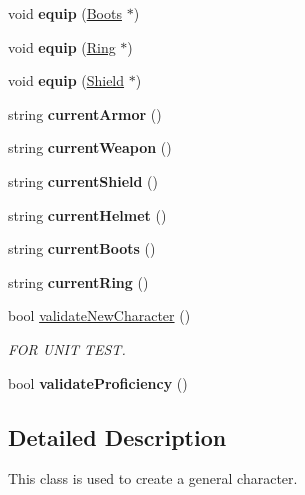 \begin{DoxyCompactItemize}
void {\bfseries equip} (\hyperlink{class_boots}{Boots} $\ast$)
\item 
\hypertarget{class_characters_a865239b8e8826d1213862897061ed718}{}\label{class_characters_a865239b8e8826d1213862897061ed718} 
void {\bfseries equip} (\hyperlink{class_ring}{Ring} $\ast$)
\item 
\hypertarget{class_characters_a5baae929baa10ce365efc64bd3bcea88}{}\label{class_characters_a5baae929baa10ce365efc64bd3bcea88} 
void {\bfseries equip} (\hyperlink{class_shield}{Shield} $\ast$)
\item 
\hypertarget{class_characters_ab2ff7cf1e6a50e005396ac7ff29c6dad}{}\label{class_characters_ab2ff7cf1e6a50e005396ac7ff29c6dad} 
string {\bfseries current\+Armor} ()
\item 
\hypertarget{class_characters_adf56654d23486d7779a006a0b5ed156e}{}\label{class_characters_adf56654d23486d7779a006a0b5ed156e} 
string {\bfseries current\+Weapon} ()
\item 
\hypertarget{class_characters_a1e4c32972619f14dbeae485316f77a5d}{}\label{class_characters_a1e4c32972619f14dbeae485316f77a5d} 
string {\bfseries current\+Shield} ()
\item 
\hypertarget{class_characters_a26db054e9899a900b62d105d5bf2b20c}{}\label{class_characters_a26db054e9899a900b62d105d5bf2b20c} 
string {\bfseries current\+Helmet} ()
\item 
\hypertarget{class_characters_a9f6a49663aceb01d8a5391d75482a224}{}\label{class_characters_a9f6a49663aceb01d8a5391d75482a224} 
string {\bfseries current\+Boots} ()
\item 
\hypertarget{class_characters_a02fd5bc3c6122b602d6aaf329a8cdaba}{}\label{class_characters_a02fd5bc3c6122b602d6aaf329a8cdaba} 
string {\bfseries current\+Ring} ()
\item 
bool \hyperlink{class_characters_a1273e2d7fe2e959cd3ed513c5717f6b7}{validate\+New\+Character} ()
\begin{DoxyCompactList}\small\item\em F\+OR U\+N\+IT T\+E\+ST. \end{DoxyCompactList}\item 
\hypertarget{class_characters_a8a13cb967bd25662f86eac505e3e874a}{}\label{class_characters_a8a13cb967bd25662f86eac505e3e874a} 
bool {\bfseries validate\+Proficiency} ()
\end{DoxyCompactItemize}


\subsection{Detailed Description}
This class is used to create a general character.

